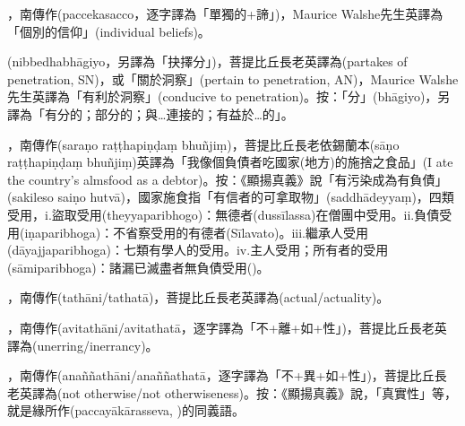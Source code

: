 \startitemgroup[noteitems]
\item{}，南傳作(paccekasacco，逐字譯為「單獨的+諦」)，Maurice Walshe先生英譯為「個別的信仰」(individual beliefs)。
\stopitemgroup

\startitemgroup[noteitems]
\item{}(nibbedhabhāgiyo，另譯為「抉擇分」)，菩提比丘長老英譯為(partakes of penetration, SN)，或「關於洞察」(pertain to penetration, AN)，Maurice Walshe先生英譯為「有利於洞察」(conducive to penetration)。按：「分」(bhāgiyo)，另譯為「有分的；部分的；與…連接的；有益於…的」。
\stopitemgroup

\startitemgroup[noteitems]
\item{}，南傳作(saraṇo raṭṭhapiṇḍaṃ bhuñjiṃ)，菩提比丘長老依錫蘭本(sāṇo raṭṭhapiṇḍaṃ bhuñjiṃ)英譯為「我像個負債者吃國家(地方)的施捨之食品」(I ate the country's almsfood as a debtor)。按：《顯揚真義》說「有污染成為有負債」(sakileso saiṇo hutvā)，國家施食指「有信者的可拿取物」(saddhādeyyaṃ)，四類受用，i.盜取受用(theyyaparibhogo)：無德者(dussīlassa)在僧團中受用。ii.負債受用(iṇaparibhoga)：不省察受用的有德者(Sīlavato)。iii.繼承人受用(dāyajjaparibhoga)：七類有學人的受用。iv.主人受用；所有者的受用(sāmiparibhoga)：諸漏已滅盡者無負債受用()。
\stopitemgroup

\startitemgroup[noteitems]
\item{}，南傳作(tathāni/tathatā)，菩提比丘長老英譯為(actual/actuality)。
\item{}，南傳作(avitathāni/avitathatā，逐字譯為「不+離+如+性」)，菩提比丘長老英譯為(unerring/inerrancy)。
\item{}，南傳作(anaññathāni/anaññathatā，逐字譯為「不+異+如+性」)，菩提比丘長老英譯為(not otherwise/not otherwiseness)。按：《顯揚真義》說，「真實性」等，就是緣所作(paccayākārasseva, )的同義語。
\stopitemgroup

